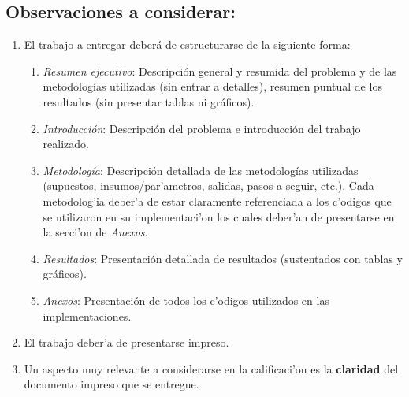 \documentclass[10pt, oneside]{article}
\begin{document}
\subsection*{Observaciones a considerar:}

\begin{enumerate}

\item
El trabajo a entregar deber\'a de estructurarse de la siguiente forma:

\begin{enumerate}
\item
\emph{Resumen ejecutivo}: Descripci\'on general y resumida del problema y de las metodolog\'ias utilizadas (sin entrar a detalles), resumen puntual de los resultados (sin presentar tablas ni gr\'aficos).
\item
\emph{Introducci\'on}: Descripci\'on del problema e introducci\'on del trabajo realizado.
\item
\emph{Metodolog\'ia}: Descripci\'on detallada de las metodolog\'ias utilizadas (supuestos, insumos/par'ametros, salidas, pasos a seguir, etc.). Cada metodolog'ia deber'a de estar claramente referenciada a los c'odigos que se utilizaron en su implementaci'on los cuales deber'an de presentarse en la secci'on de \emph{Anexos}.
\item
\emph{Resultados}: Presentaci\'on detallada de resultados (sustentados con tablas y gr\'aficos).
\item
\emph{Anexos}: Presentaci\'on de todos los c'odigos utilizados en las implementaciones.
\end{enumerate}

\item
El trabajo deber'a de presentarse impreso. 

\item
Un aspecto muy relevante a considerarse en la calificaci'on es la \textbf{claridad} del documento impreso que se entregue.

\end{enumerate}
\end{document}
